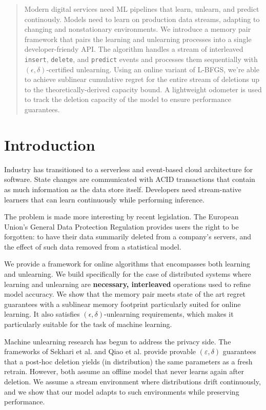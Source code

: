 \documentclass[a4paper,12pt]{article}
\begin{document}
\begin{abstract}

Modern digital services need ML pipelines that learn, unlearn, and predict continously. Models need to learn on production data streams, adapting to changing and nonstationary environments. We introduce a memory pair framework that pairs the learning and unlearning processes into a single developer-friendy API. The algorithm handles a stream of interleaved \texttt{insert}, \texttt{delete}, and \texttt{predict} events and processes them sequentially with $(\epsilon, \delta)$-certified unlearning. Using an online variant of L-BFGS, we're able to achieve sublinear cumulative regret for the entire stream of deletions up to the theoretically-derived capacity bound. A lightweight odometer is used to track the deletion capacity of the model to ensure performance guarantees.

\end{abstract}


\section{Introduction}

Industry has transitioned to a serverless and event-based cloud architecture for software. State changes are communicated with ACID transactions that contain as much information as the data store itself. Developers need stream-native learners that can learn continuously while performing inference.

The problem is made more interesting by recent legislation. The European Union's General Data Protection Regulation provides users the right to be forgotten: to have their data summarily deleted from a company's servers, and the effect of such data removed from a statistical model.

We provide a framework for online algorithms that encompasses both learning and unlearning. We build specifically for the case of distributed systems where learning and unlearning are \textbf{necessary, interleaved} operations used to refine model accuracy. We show that the memory pair meets state of the art regret guarantees with a sublinear memory footprint particularly suited for online learning. It also satisfies $(\epsilon,\delta)$-unlearning requirements, which makes it particularly suitable for the task of machine learning.


Machine unlearning research has begun to address the privacy side.  The frameworks of Sekhari et al. and Qiao et al. provide provable $(\varepsilon,\delta)$ guarantees that a post-hoc deletion yields (in distribution) the same parameters as a fresh retrain.  However, both assume an offline model that never learns again after deletion. We assume a stream environment where distributions drift continuously, and we show that our model adapts to such environments while preserving performance.
\end{document}
